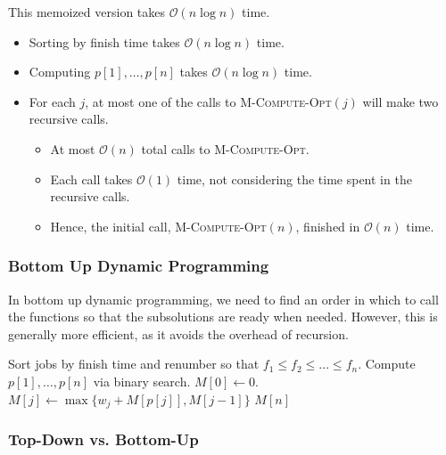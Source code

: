 \begin{claim}
    This memoized version takes $\mathcal{O}(n \log n)$ time.
\end{claim}

\begin{itemize}
    \item Sorting by finish time takes $\mathcal{O}(n \log n)$ time.
    \item Computing $p[1], \dots, p[n]$ takes $\mathcal{O}(n \log n)$ time.
    \item For each $j$, at most one of the calls to \textsc{M-Compute-Opt}$(j)$ will make two recursive calls.
    \begin{itemize}
        \item At most $\mathcal{O}(n)$ total calls to \textsc{M-Compute-Opt}.
        \item Each call takes $\mathcal{O}(1)$ time, not considering the time spent in the recursive calls. 
        \item Hence, the initial call, \textsc{M-Compute-Opt}$(n)$, finished in $\mathcal{O}(n)$ time.
    \end{itemize}
\end{itemize}

\subsubsection{Bottom Up Dynamic Programming}

In bottom up dynamic programming, we need to find an order in which to call the functions so that the subsolutions are ready when needed. However, this is generally more efficient, as it avoids the overhead of recursion.

\begin{algorithm}[ht!]
    \begin{algorithmic}[1]
            \State Sort jobs by finish time and renumber so that $f_1 \leq f_2 \leq \ldots \leq f_n$.
            \State Compute $p[1], \dots, p[n]$ via binary search.
            \State $M[0] \gets 0$.
                \State $M[j] \gets \max\{w_j + M[p[j]], M[j - 1]\}$
            \EndFor
            \State \Return $M[n]$
        \EndFunction
    \end{algorithmic}
\end{algorithm}

\subsubsection{Top-Down vs. Bottom-Up}

